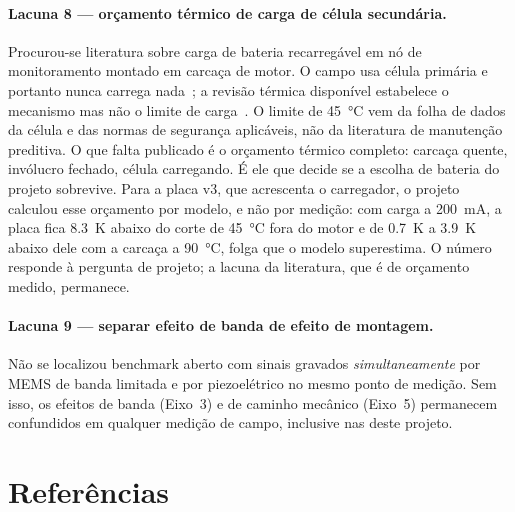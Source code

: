 \documentclass[11pt,a4paper]{article}
\begin{document}
\paragraph{Lacuna 8 --- orçamento térmico de carga de célula secundária.} Procurou-se
literatura sobre carga de bateria recarregável em nó de monitoramento montado em carcaça
de motor. O campo usa célula primária e portanto nunca carrega nada~\cite{nabavi2025}; a
revisão térmica disponível estabelece o mecanismo mas não o limite de
carga~\cite{ma2018}. O limite de \SI{45}{\celsius} vem da folha de dados da célula e das
normas de segurança aplicáveis, não da literatura de manutenção preditiva. O que falta
publicado é o orçamento térmico completo: carcaça quente, invólucro fechado, célula
carregando. É ele que decide se a escolha de bateria do projeto sobrevive. Para a placa v3,
que acrescenta o carregador, o projeto calculou esse orçamento por modelo, e não por
medição: com carga a \SI{200}{\milli\ampere}, a placa fica \SI{8,3}{\kelvin} abaixo do
corte de \SI{45}{\celsius} fora do motor e de \SI{0,7}{\kelvin} a \SI{3,9}{\kelvin} abaixo
dele com a carcaça a \SI{90}{\celsius}, folga que o modelo superestima. O número responde à
pergunta de projeto; a lacuna da literatura, que é de orçamento medido, permanece.

\paragraph{Lacuna 9 --- separar efeito de banda de efeito de montagem.} Não se localizou
benchmark aberto com sinais gravados \emph{simultaneamente} por MEMS de banda limitada e
por piezoelétrico no mesmo ponto de medição. Sem isso, os efeitos de banda (Eixo~3) e de
caminho mecânico (Eixo~5) permanecem confundidos em qualquer medição de campo, inclusive
nas deste projeto.

\section{Referências}
\label{sec:bib}
\end{document}
